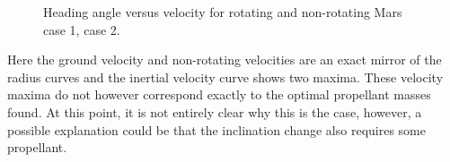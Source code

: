 \begin{figure}[H]
\centering
{} 
\caption{Heading angle versus velocity for rotating and non-rotating Mars \protect{} case 1,  \protect{} case 2. } 
\label{fig:headingAngleVsVelocityCase1combined} 
\end{figure}

\noindent
Here the ground velocity and non-rotating velocities are an exact mirror of the radius curves and the inertial velocity curve shows two maxima. These velocity maxima do not however correspond exactly to the optimal propellant masses found. At this point, it is not entirely clear why this is the case, however, a possible explanation could be that the inclination change also requires some propellant.

%
